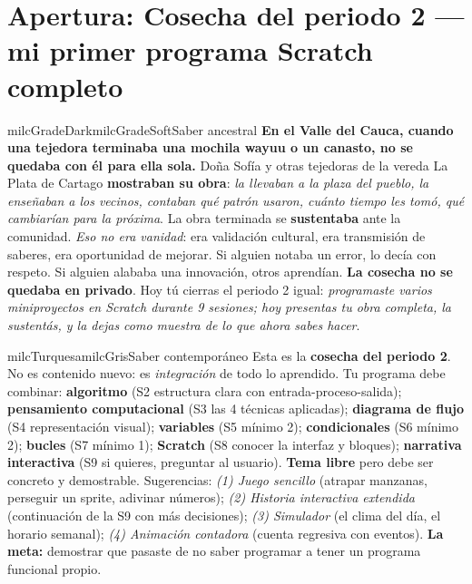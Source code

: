 \documentclass[11pt,letterpaper]{article}
\begin{document}
\newpage

\section*{Apertura: Cosecha del periodo 2 --- mi primer programa Scratch completo}

\begin{softbox}{milcGradeDark}{milcGradeSoft}{Saber ancestral}
\textbf{En el Valle del Cauca, cuando una tejedora terminaba una mochila wayuu o un canasto, no se quedaba con él para ella sola.} Doña Sofía y otras tejedoras de la vereda La Plata de Cartago \textbf{mostraban su obra}: \emph{la llevaban a la plaza del pueblo, la enseñaban a los vecinos, contaban qué patrón usaron, cuánto tiempo les tomó, qué cambiarían para la próxima}. La obra terminada se \textbf{sustentaba} ante la comunidad. \emph{Eso no era vanidad}: era validación cultural, era transmisión de saberes, era oportunidad de mejorar. Si alguien notaba un error, lo decía con respeto. Si alguien alababa una innovación, otros aprendían. \textbf{La cosecha no se quedaba en privado}. Hoy tú cierras el periodo 2 igual: \emph{programaste varios miniproyectos en Scratch durante 9 sesiones; hoy presentas tu obra completa, la sustentás, y la dejas como muestra de lo que ahora sabes hacer}.
\end{softbox}

\begin{softbox}{milcTurquesa}{milcGris}{Saber contemporáneo}
Esta es la \textbf{cosecha del periodo 2}. No es contenido nuevo: es \emph{integración} de todo lo aprendido. Tu programa debe combinar: \textbf{algoritmo} (S2 estructura clara con entrada-proceso-salida); \textbf{pensamiento computacional} (S3 las 4 técnicas aplicadas); \textbf{diagrama de flujo} (S4 representación visual); \textbf{variables} (S5 mínimo 2); \textbf{condicionales} (S6 mínimo 2); \textbf{bucles} (S7 mínimo 1); \textbf{Scratch} (S8 conocer la interfaz y bloques); \textbf{narrativa interactiva} (S9 si quieres, preguntar al usuario). \textbf{Tema libre} pero debe ser concreto y demostrable. Sugerencias: \emph{(1) Juego sencillo} (atrapar manzanas, perseguir un sprite, adivinar números); \emph{(2) Historia interactiva extendida} (continuación de la S9 con más decisiones); \emph{(3) Simulador} (el clima del día, el horario semanal); \emph{(4) Animación contadora} (cuenta regresiva con eventos). \textbf{La meta:} demostrar que pasaste de no saber programar a tener un programa funcional propio.
\end{softbox}
\end{document}
